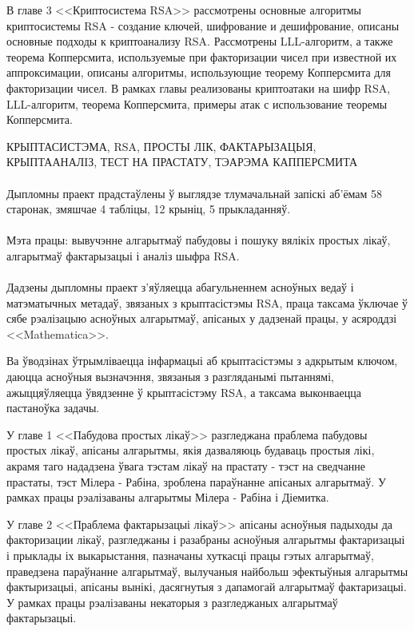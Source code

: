 	В главе 3 <<Криптосистема RSA>> рассмотрены основные алгоритмы криптосистемы RSA - создание ключей, шифрование и дешифрование, описаны основные
	подходы к криптоанализу RSA. Рассмотрены LLL-алгоритм, а также теорема Копперсмита, используемые при факторизации чисел при известной их 
	аппроксимации, описаны алгоритмы, использующие теорему Копперсмита для факторизации чисел. В рамках главы реализованы криптоатаки на шифр RSA, LLL-алгоритм, теорема 
	Копперсмита, примеры атак с использование теоремы Копперсмита.

\newpage

КРЫПТАСИСТЭМА, RSA, ПРОСТЫ ЛIК, ФАКТАРЫЗАЦЫЯ, КРЫПТААНАЛIЗ, ТЕСТ НА ПРАСТАТУ, ТЭАРЭМА КАППЕРСМИТА

\paragraph{} Дыпломны праект прадстаўлены ў выглядзе тлумачальнай запіскі аб'ёмам 58 старонак, змяшчае 4 табліцы, 12 крыніц, 5 прыкладанняў.

\paragraph{} Мэта працы: вывучэнне алгарытмаў пабудовы і пошуку вялікіх простых лікаў, алгарытмаў фактарызацыі і аналіз шыфра RSA.

\paragraph{} Дадзены дыпломны праект з'яўляецца абагульненнем асноўных ведаў і матэматычных метадаў, звязаных з крыптасістэмы RSA, праца таксама
ўключае ў сябе рэалізацыю асноўных алгарытмаў, апісаных у дадзенай працы, у асяроддзі <<Mathematica>>.

Ва ўводзінах ўтрымліваецца інфармацыі аб крыптасістэмы з адкрытым ключом, даюцца асноўныя вызначэння, звязаныя з разгляданымі пытаннямі,
ажыццяўляецца ўвядзенне ў крыптасістэму RSA, а таксама выконваецца пастаноўка задачы.

У главе 1 <<Пабудова простых лікаў>> разгледжана праблема пабудовы простых лікаў, апісаны алгарытмы, якія дазваляюць будаваць простыя лікі,
акрамя таго нададзена ўвага тэстам лікаў на прастату - тэст на сведчанне прастаты, тэст Мілера - Рабіна, зроблена параўнанне апісаных алгарытмаў. У рамках
працы рэалізаваны алгарытмы Мілера - Рабіна і Діемитка.

У главе 2 <<Праблема фактарызацыі лікаў>> апісаны асноўныя падыходы да факторизации лікаў, разгледжаны і разабраны асноўныя алгарытмы фактаризацыі і прыклады іх выкарыстання, пазначаны хуткасці працы гэтых алгарытмаў, праведзена параўнанне алгарытмаў, вылучаныя найбольш эфектыўныя алгарытмы фактыризацыі, апісаны вынікі, дасягнутыя з дапамогай алгарытмаў фактаризацыі. У рамках працы рэалізаваны некаторыя з разгледжаных алгарытмаў фактарызацыі.

